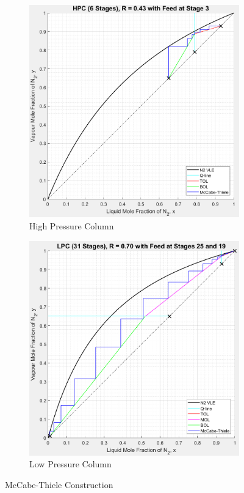     \begin{figure}[H]
        \begin{subfigure}{0.49\textwidth}
            \includegraphics[width=\linewidth]{HPC_v1.jpeg}
            \caption{High Pressure Column}
            \label{fig:HPC_v1}
        \end{subfigure}
        \hspace*{\fill} %
        \begin{subfigure}{0.49\textwidth}
            \includegraphics[width=\linewidth]{LPC_v1.jpeg}
            \caption{Low Pressure Column}
            \label{fig:LPC_v1}
        \end{subfigure}
        \caption{McCabe-Thiele Construction}                        \label{fig:mccabe_v1}
    \end{figure}
